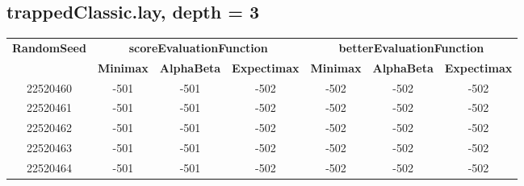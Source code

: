 \documentclass[english, a4paper,12pt]{article}
\begin{document}
\subsection*{trappedClassic.lay, depth = 3}
\small\begin{tabular}{|c|c|c|c|c|c|c|}
\hline
\textbf{RandomSeed} & \multicolumn{3}{c|}{\textbf{scoreEvaluationFunction}} & \multicolumn{3}{c|}{\textbf{betterEvaluationFunction}} \\
\cline{2-7}
& \textbf{Minimax} & \textbf{AlphaBeta} & \textbf{Expectimax} & \textbf{Minimax} & \textbf{AlphaBeta} & \textbf{Expectimax} \\
\hline
22520460 & \textcolor{red!70}{-501} & \textcolor{red!70}{-501} & \textcolor{red!70}{-502} & \textcolor{red!70}{-502} & \textcolor{red!70}{-502} & \textcolor{red!70}{-502} \\
22520461 & \textcolor{red!70}{-501} & \textcolor{red!70}{-501} & \textcolor{red!70}{-502} & \textcolor{red!70}{-502} & \textcolor{red!70}{-502} & \textcolor{red!70}{-502} \\
22520462 & \textcolor{red!70}{-501} & \textcolor{red!70}{-501} & \textcolor{red!70}{-502} & \textcolor{red!70}{-502} & \textcolor{red!70}{-502} & \textcolor{red!70}{-502} \\
22520463 & \textcolor{red!70}{-501} & \textcolor{red!70}{-501} & \textcolor{red!70}{-502} & \textcolor{red!70}{-502} & \textcolor{red!70}{-502} & \textcolor{red!70}{-502} \\
22520464 & \textcolor{red!70}{-501} & \textcolor{red!70}{-501} & \textcolor{red!70}{-502} & \textcolor{red!70}{-502} & \textcolor{red!70}{-502} & \textcolor{red!70}{-502} \\
\hline
\end{tabular}
\end{document}
